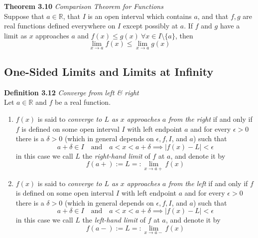 \documentclass[8pt,landscape]{article}
\begin{document}
\begin{multicols}{3}
\begin{enumerate}
    \end{enumerate}


    \textbf{Theorem 3.10} \emph{Comparison Theorem for Functions} \\
    Suppose that $a \in \mathbb{R}$, that $I$ is an open interval which contains $a$,
    and that $f, g$ are real functions defined everywhere on $I$ except possibly at $a$.
    If $f$ and $g$ have a limit as $x$ approaches $a$ and
    $f(x) \leq g(x) \ \forall x \in I \setminus \{a\}$, then
    \[
        \lim_{x \to a} f(x) \leq \lim_{x \to a} g(x)
    \]



    \subsection{One-Sided Limits and Limits at Infinity}



    \textbf{Definition 3.12} \emph{Converge from left \& right} \\
    Let $a \in \mathbb{R}$ and $f$ be a real function.
    \begin{enumerate}
        \item $f(x)$ is said to \emph{converge to $L$ as $x$ approaches $a$ from the right}
            if and only if $f$ is defined on some open interval $I$ with left endpoint $a$
            and for every $\epsilon > 0$ there is a $\delta > 0$
            (which in general depends on $\epsilon, f, I$, and $a$) such that
            \[
                a + \delta \in I \quad \text{and} \quad a < x < a + \delta \implies
                |f(x) - L| < \epsilon
            \]
            in this case we call $L$ the \emph{right-hand limit} of $f$ at $a$,
            and denote it by
            \[
                f(a+) := L =: \lim_{x \to a+} f(x)
            \]
        \item $f(x)$ is said to \emph{converge to $L$ as $x$ approaches $a$ from the left}
            if and only if $f$ is defined on some open interval $I$ with left endpoint $a$
            and for every $\epsilon > 0$ there is a $\delta > 0$
            (which in general depends on $\epsilon, f, I$, and $a$) such that
            \[
                a + \delta \in I \quad \text{and} \quad a < x < a + \delta \implies
                |f(x) - L| < \epsilon
            \]
            in this case we call $L$ the \emph{left-hand limit} of $f$ at $a$,
            and denote it by
            \[
                f(a-) := L =: \lim_{x \to a-} f(x)
            \]
    \end{enumerate}



\end{multicols}
\end{document}

